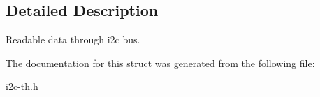 \subsection{Detailed Description}
Readable data through i2c bus. 

The documentation for this struct was generated from the following file\+:\begin{DoxyCompactItemize}
\item 
\hyperlink{i2c-th_8h}{i2c-\/th.\+h}\end{DoxyCompactItemize}
